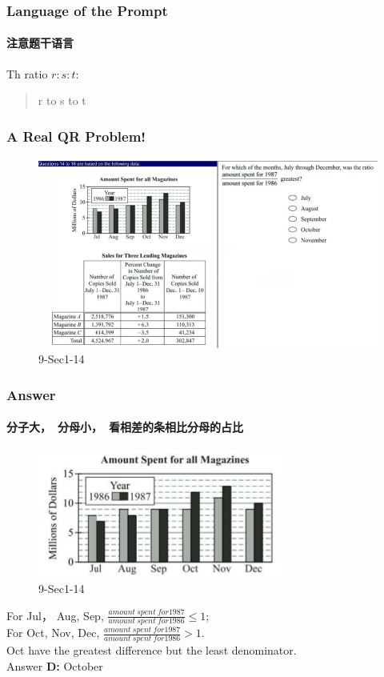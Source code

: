 \documentclass[
	11pt, %
]{beamer}
\begin{document}

\begin{frame}
	\frametitle{Language of the Prompt}
	\framesubtitle{注意题干语言}
	{\LARGE Th ratio $r:s:t$:} 
	\begin{quote}
	{\LARGE r to s to t}
	\end{quote}
\end{frame}


\begin{frame}
	\frametitle{A Real QR Problem!}
	\framesubtitle{}
	\begin{figure}
		\includegraphics[width=\linewidth]{Ratio_Example_Question1.png}
		\caption{9-Sec1-14}
	\end{figure}

\end{frame}


\begin{frame}
	\frametitle{Answer}
	\framesubtitle{分子大，\ 分母小，\ 看相差的条相比分母的占比}

	\begin{figure}
		\includegraphics[width=0.5\linewidth]{Ratio_Example_Question1_1.png}
		\caption{9-Sec1-14}
	\end{figure}

For Jul， Aug, Sep, $\frac{amount \ spent \ for 1987}{amount \ spent \ for 1986} \leq 1$; \\
For Oct, Nov, Dec, $\frac{amount \ spent \ for 1987}{amount \ spent \ for 1986} > 1$. \\
Oct have the greatest difference but the least denominator. \\


	

\bigskip
Answer \textbf{D: } October\\
\end{frame}
\end{document}
